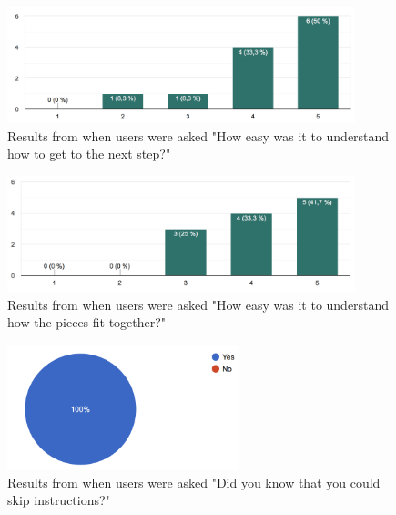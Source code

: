 \begin{figure}[hbtp]
\begin{center}
\includegraphics[width = 0.9\textwidth]{./Images/easyToGetToNext.png}
\caption{Results from when users were asked "How easy was it to understand how to get to the next step?"}
\label{fig:question1}
\end{center}
\end{figure}

\begin{figure}[hbtp]
\begin{center}
\includegraphics[width = 0.9\textwidth]{./Images/easyToUnderstand.png}
\caption{Results from when users were asked "How easy was it to understand how the pieces fit together?"}
\label{fig:question2}
\end{center}
\end{figure}

\begin{figure}[hbtp]
\begin{center}
\includegraphics[width = 0.6\textwidth]{./Images/knowToSkip.png}
\caption{Results from when users were asked "Did you know that you could skip instructions?"}
\label{fig:question3}
\end{center}
\end{figure}

